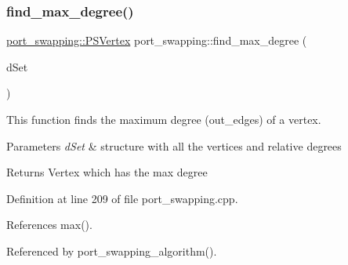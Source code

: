 \mbox{\label{classport__swapping_a6f8dd7bd988dfeb3d4e220cff3014c11}} 
\subsubsection{\texorpdfstring{find\+\_\+max\+\_\+degree()}{find\_max\_degree()}}
{\footnotesize\ttfamily \hyperlink{classport__swapping_a9588366dd46f9f32aab2c8de93d5679f}{port\+\_\+swapping\+::\+P\+S\+Vertex} port\+\_\+swapping\+::find\+\_\+max\+\_\+degree (\begin{DoxyParamCaption}\item[{\hyperlink{classCustomOrderedSet}{Custom\+Ordered\+Set}$<$ std\+::pair$<$ \hyperlink{classport__swapping_a9588366dd46f9f32aab2c8de93d5679f}{P\+S\+Vertex}, unsigned int $>$$>$ \&}]{d\+Set }\end{DoxyParamCaption})}



This function finds the maximum degree (out\+\_\+edges) of a vertex. 


\begin{DoxyParams}{Parameters}
{\em d\+Set} & structure with all the vertices and relative degrees \\
\hline
\end{DoxyParams}
\begin{DoxyReturn}{Returns}
Vertex which has the max degree 
\end{DoxyReturn}


Definition at line 209 of file port\+\_\+swapping.\+cpp.



References max().



Referenced by port\+\_\+swapping\+\_\+algorithm().

